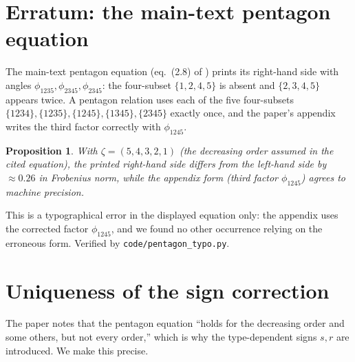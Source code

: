\documentclass[11pt]{article}
\theoremstyle{plain}
\newtheorem{proposition}[theorem]{Proposition}
\theoremstyle{definition}
\theoremstyle{remark}
\begin{document}
\section{Erratum: the main-text pentagon equation}
The main-text pentagon equation (eq.~(2.8) of \cite{rohozhkin2026}) prints its
right-hand side with angles $\phi_{1235},\phi_{2345},\phi_{2345}$: the four-subset $\{1,2,4,5\}$ is
absent and $\{2,3,4,5\}$ appears twice. A pentagon relation uses each of the five four-subsets
$\{1234\},\{1235\},\{1245\},\{1345\},\{2345\}$ exactly once, and the paper's appendix writes the
third factor correctly with $\phi_{1245}$.

\begin{proposition}\label{prop:typo}
With $\zeta=(5,4,3,2,1)$ (the decreasing order assumed in the cited equation), the printed
right-hand side differs from the left-hand side by $\approx 0.26$ in Frobenius norm, while the
appendix form (third factor $\phi_{1245}$) agrees to machine precision.
\end{proposition}
This is a typographical error in the displayed equation only: the appendix uses the corrected
factor $\phi_{1245}$, and we found no other occurrence relying on the erroneous form. Verified
by \texttt{code/pentagon\_typo.py}.

\section{Uniqueness of the sign correction}
The paper notes that the pentagon equation ``holds for the decreasing order and some others, but
not every order,'' which is why the type-dependent signs $s,r$ are introduced. We make this
precise.
\end{document}

